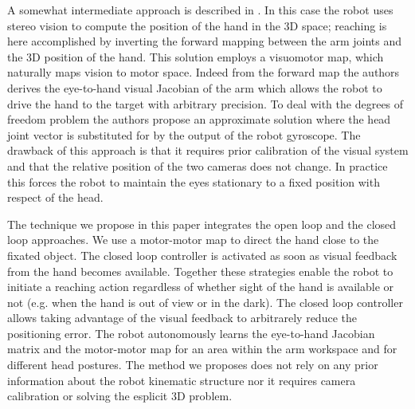 A somewhat intermediate approach is described in \cite{scaz07fast}. In 
this case the robot uses stereo vision to compute the position
of the hand in the 3D space; reaching is here accomplished by inverting the 
forward mapping between the arm joints and the 3D position of the hand. This 
solution employs a visuomotor map, which naturally maps vision to motor space. 
Indeed from the forward map the authors derives the eye-to-hand visual 
Jacobian of the arm which allows the robot to drive the hand to the target with 
arbitrary precision. To deal with the degrees of freedom problem the authors
propose an approximate solution where the head joint vector is substituted 
for by the output of the robot gyroscope. The drawback of this approach is that 
it requires prior calibration of the visual system and that the relative position 
of the two cameras does not change. In practice this forces the robot to maintain 
the eyes stationary to a fixed position with respect of the head. 

The technique we propose in this paper integrates the open loop and the 
closed loop approaches. We use a motor-motor map to direct 
the hand close to the fixated object. The closed loop controller is activated 
as soon as visual feedback from the hand becomes available. Together 
these strategies enable the robot to initiate a reaching action regardless
of whether sight of the hand is available or not (e.g. when the hand is 
out of view or in the dark). The closed loop controller allows taking
advantage of the visual feedback to arbitrarely reduce the positioning
error. The robot autonomously learns the eye-to-hand Jacobian matrix and 
the motor-motor map for an area within the arm workspace and for different
head postures. The method we proposes does not rely on any prior information
about the robot kinematic structure nor it requires camera calibration 
or solving the esplicit 3D problem.
